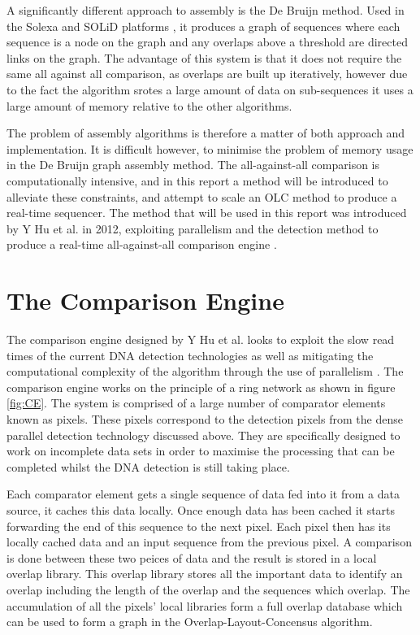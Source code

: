 A significantly different approach to assembly is the De Bruijn method. Used in the Solexa and SOLiD platforms \cite{miller2010assembly}, it produces a graph of sequences where each sequence is a node on the graph and any overlaps above a threshold are directed links on the graph. The advantage of this system is that it does not require the same all against all comparison, as overlaps are built up iteratively, however due to the fact the algorithm srotes a large amount of data on sub-sequences it uses a large amount of memory relative to the other algorithms. 


The problem of assembly algorithms is therefore a matter of both approach and implementation. It is difficult however, to minimise the problem of memory usage in the De Bruijn graph assembly method. The all-against-all comparison is computationally intensive, and in this report a method will be introduced to alleviate these constraints, and attempt to scale an OLC method to produce a real-time sequencer. The method that will be used in this report was introduced by Y Hu et al. in 2012, exploiting parallelism and the detection method to produce a real-time all-against-all comparison engine \cite{hu2012cmos}.
\section{The Comparison Engine}
The comparison engine designed by Y Hu et al. looks to exploit the slow read times of the current DNA detection technologies as well as mitigating the computational complexity of the algorithm through the use of parallelism \cite{hu2012cmos}. The comparison engine works on the principle of a ring network as shown in figure \ref{fig:CE}. The system is comprised of a large number of comparator elements known as pixels. These pixels correspond to the detection pixels from the dense parallel detection technology discussed above. They are specifically designed to work on incomplete data sets in order to maximise the processing that can be completed whilst the DNA detection is still taking place. 
  
Each comparator element gets a single sequence of data fed into it from a data source, it caches this data locally. Once enough data has been cached it starts forwarding the end of this sequence to the next pixel. Each pixel then has its locally cached data and an input sequence from the previous pixel. A comparison is done between these two peices of data and the result is stored in a local overlap library. This overlap library stores all the important data to identify an overlap including the length of the overlap and the sequences which overlap. The accumulation of all the pixels' local libraries form a full overlap database which can be used to form a graph in the Overlap-Layout-Concensus algorithm.


